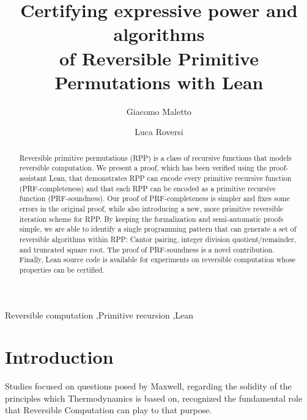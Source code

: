\documentclass[preprint]{elsarticle}
\theoremstyle{remark}
\newcommand{\RPP}{\textsf{RPP}\xspace}
\newcommand{\PRF}{\textsf{PRF}\xspace}
\newcommand{\LEAN}{\textsf{Lean}\xspace}
\begin{document}
\begin{frontmatter}

\title{Certifying expressive power and algorithms\\  of Reversible Primitive Permutations with \LEAN}


\author[1]{Giacomo Maletto}

\author[2]{Luca Roversi}



\begin{abstract}
Reversible primitive permutations (\RPP) is a class of recursive functions that models reversible computation. We present a proof, which has been verified using the proof-assistant \LEAN, that demonstrates \RPP can encode every primitive recursive function (\PRF-completeness) and that each \RPP can be encoded as a primitive recursive function (\PRF-soundness). Our proof of \PRF-completeness is simpler and fixes some errors in the original proof, while also introducing a new, more primitive reversible iteration scheme for \RPP. By keeping the formalization and semi-automatic proofs simple, we are able to identify a single programming pattern that can generate a set of reversible algorithms within \RPP: Cantor pairing, integer division quotient/remainder, and truncated square root. The proof of \PRF-soundness is a novel contribution. Finally, \LEAN source code is available for experiments on reversible computation whose properties can be certified.
\end{abstract}

\begin{keyword}
    Reversible computation \sep Primitive recursion \sep Lean
\end{keyword}

\end{frontmatter}

\section{Introduction}
\label{section:Introduction}
Studies focused on questions posed by Maxwell, regarding the solidity of the principles which Thermodynamics is based on, recognized the fundamental role that Reversible Computation can play to that purpose.
\end{document}
